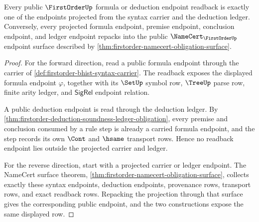 \begin{theorem}\label{thm:firstorder-endpoint-exactness-obligation}
Every public $\FirstOrderUp$ formula or deduction endpoint readback is exactly
one of the endpoints projected from the syntax carrier and the deduction
ledger. Conversely, every projected formula endpoint, premise endpoint,
conclusion endpoint, and ledger endpoint repacks into the public
$\NameCert_{\FirstOrderUp}$ endpoint surface described by
\autoref{thm:firstorder-namecert-obligation-surface}.
\end{theorem}
\begin{proof}
For the forward direction, read a public formula endpoint through the carrier
of \autoref{def:firstorder-bhist-syntax-carrier}. The readback exposes the
displayed formula endpoint $\varphi$, together with its $\SetUp$ symbol row,
$\TreeUp$ parse row, finite arity ledger, and $\mathsf{SigRel}$ endpoint
relation.

A public deduction endpoint is read through the deduction ledger. By
\autoref{thm:firstorder-deduction-soundness-ledger-obligation}, every premise
and conclusion consumed by a rule step is already a carried formula endpoint,
and the step records its own $\Cont$ and $\hsame$ transport rows. Hence no
readback endpoint lies outside the projected carrier and ledger.

For the reverse direction, start with a projected carrier or ledger endpoint.
The NameCert surface theorem,
\autoref{thm:firstorder-namecert-obligation-surface}, collects exactly these
syntax endpoints, deduction endpoints, provenance rows, transport rows, and
exact readback rows. Repacking the projection through that surface gives the
corresponding public endpoint, and the two constructions expose the same
displayed row.
\end{proof}

